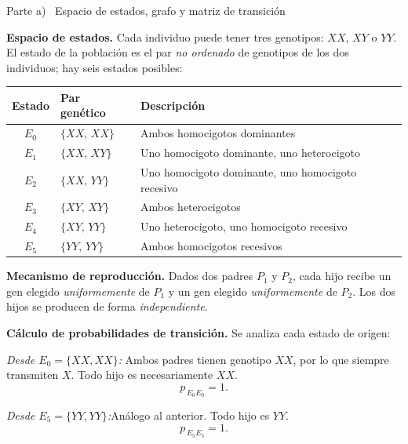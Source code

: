 \documentclass[10pt,a4paper]{article}
\newcommand{\pij}[2]{p_{\,#1#2}}
\newcommand{\parteheader}[1]{%
  \vspace{8pt}\needspace{4cm}\noindent
  \begin{tcolorbox}[
    colback=subsecbg!18, colframe=subsecbg!55,
    sharp corners, boxrule=0.4pt,
    left=6pt, right=6pt, top=3pt, bottom=3pt,
    fontupper=\small\bfseries\sffamily,
  ]
  #1
  \end{tcolorbox}\vspace{2pt}%
}
\begin{document}
\vspace{6pt}

\parteheader{Parte a) \textperiodcentered\ Espacio de estados, grafo y matriz de transici\'on}

\textbf{Espacio de estados.}\quad
Cada individuo puede tener tres genotipos: $XX$, $XY$ o $YY$. El estado de la
poblaci\'on es el par \emph{no ordenado} de genotipos de los dos individuos; hay
seis estados posibles:

\begin{center}
  \begin{tabular}{cll}
    \toprule
    Estado & Par gen\'etico & Descripci\'on                                     \\
    \midrule
    $E_0$  & $\{XX,\,XX\}$  & Ambos homocigotos dominantes                      \\
    $E_1$  & $\{XX,\,XY\}$  & Uno homocigoto dominante, uno heterocigoto        \\
    $E_2$  & $\{XX,\,YY\}$  & Uno homocigoto dominante, uno homocigoto recesivo \\
    $E_3$  & $\{XY,\,XY\}$  & Ambos heterocigotos                               \\
    $E_4$  & $\{XY,\,YY\}$  & Uno heterocigoto, uno homocigoto recesivo         \\
    $E_5$  & $\{YY,\,YY\}$  & Ambos homocigotos recesivos                       \\
    \bottomrule
  \end{tabular}
\end{center}

\medskip
\textbf{Mecanismo de reproducci\'on.}\quad
Dados dos padres $P_1$ y $P_2$, cada hijo recibe un gen elegido
\emph{uniformemente} de $P_1$ y un gen elegido \emph{uniformemente} de $P_2$.
Los dos hijos se producen de forma \emph{independiente}.

\medskip
\textbf{C\'alculo de probabilidades de transici\'on.}\quad
Se analiza cada estado de origen:

\medskip
\noindent\textit{Desde $E_0 = \{XX,XX\}$:}\quad
Ambos padres tienen genotipo $XX$, por lo que siempre transmiten $X$. Todo hijo
es necesariamente $XX$.
\[
  \pij{E_0}{E_0} = 1.
\]

\noindent\textit{Desde $E_5 = \{YY,YY\}$:}\quad An\'alogo al anterior. Todo hijo es $YY$.
\[
  \pij{E_5}{E_5} = 1.
\]
\end{document}

